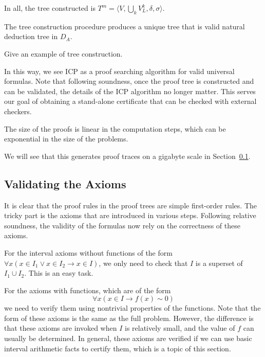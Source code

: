 \documentclass[envcountsect]{llncs}
\begin{document}
 In all, the tree constructed is $T^m = \langle V, \bigcup_k V_L^k, \delta,
\sigma\rangle$. 

\begin{theorem}\label{successful_tree}
The tree construction procedure produces a unique tree that is valid natural
deduction tree in $D_A$. 
\end{theorem}

\begin{example}
Give an example of tree construction.
\end{example}

In this way, we see ICP as a proof searching algorithm for valid universal
formulas. Note that following soundness, once the proof tree is constructed and
can be validated, the details of the ICP algorithm no longer matter. This serves
our goal of obtaining a stand-alone certificate that can be checked with
external checkers.

\begin{proposition}
 The size of the proofs is linear in the computation steps, which can be
exponential in the size of the problems. 
\end{proposition}

We will see that this generates proof traces on a gigabyte scale in
Section~\ref{}. 




\subsection{Validating the Axioms}

It is clear that the proof rules in the proof trees are simple first-order
rules. The tricky part is the axioms that are introduced in various
steps. Following relative soundness, the validity of the formulas now rely on the
correctness of these axioms.

For the interval axioms without functions of the form $\forall x(x\in I_1\vee
x\in I_2\rightarrow x\in I)$, we only need to check that $I$ is a superset of
$I_1\cup I_2$. This is an easy task.

For the axioms with functions, which are of the form
$$\forall x (x\in I \rightarrow f(x)\sim 0)$$
we need to verify them using nontrivial properties of the functions. Note that
the form of these axioms is the same as the full problem. However, the
difference is that these axioms are invoked when $I$ is relatively small, and
the value of $f$ can usually be determined. In general, these axioms are
verified if we can use basic interval arithmetic facts to certify them, which is
a topic of this section.
\end{document}
